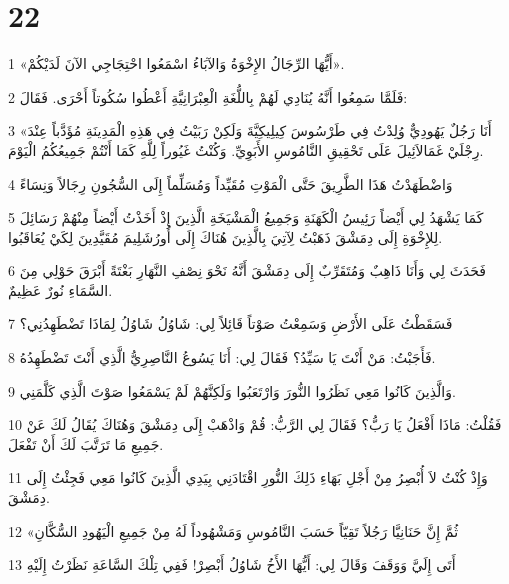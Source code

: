 \chapter{22}

\par 1 «أَيُّهَا الرِّجَالُ الإِخْوَةُ وَالآبَاءُ اسْمَعُوا احْتِجَاجِي الآنَ لَدَيْكُمْ».
\par 2 فَلَمَّا سَمِعُوا أَنَّهُ يُنَادِي لَهُمْ بِاللُّغَةِ الْعِبْرَانِيَّةِ أَعْطُوا سُكُوتاً أَحْرَى. فَقَالَ:
\par 3 «أَنَا رَجُلٌ يَهُودِيٌّ وُلِدْتُ فِي طَرْسُوسَ كِيلِيكِيَّةَ وَلَكِنْ رَبَيْتُ فِي هَذِهِ الْمَدِينَةِ مُؤَدَّباً عِنْدَ رِجْلَيْ غَمَالاَئِيلَ عَلَى تَحْقِيقِ النَّامُوسِ الأَبَوِيِّ. وَكُنْتُ غَيُوراً لِلَّهِ كَمَا أَنْتُمْ جَمِيعُكُمُ الْيَوْمَ.
\par 4 وَاضْطَهَدْتُ هَذَا الطَّرِيقَ حَتَّى الْمَوْتِ مُقَيِّداً وَمُسَلِّماً إِلَى السُّجُونِ رِجَالاً وَنِسَاءً
\par 5 كَمَا يَشْهَدُ لِي أَيْضاً رَئِيسُ الْكَهَنَةِ وَجَمِيعُ الْمَشْيَخَةِ الَّذِينَ إِذْ أَخَذْتُ أَيْضاً مِنْهُمْ رَسَائِلَ لِلإِخْوَةِ إِلَى دِمَشْقَ ذَهَبْتُ لِآتِيَ بِالَّذِينَ هُنَاكَ إِلَى أُورُشَلِيمَ مُقَيَّدِينَ لِكَيْ يُعَاقَبُوا.
\par 6 فَحَدَثَ لِي وَأَنَا ذَاهِبٌ وَمُتَقَرِّبٌ إِلَى دِمَشْقَ أَنَّهُ نَحْوَ نِصْفِ النَّهَارِ بَغْتَةً أَبْرَقَ حَوْلِي مِنَ السَّمَاءِ نُورٌ عَظِيمٌ.
\par 7 فَسَقَطْتُ عَلَى الأَرْضِ وَسَمِعْتُ صَوْتاً قَائِلاً لِي: شَاوُلُ شَاوُلُ لِمَاذَا تَضْطَهِدُنِي؟
\par 8 فَأَجَبْتُ: مَنْ أَنْتَ يَا سَيِّدُ؟ فَقَالَ لِي: أَنَا يَسُوعُ النَّاصِرِيُّ الَّذِي أَنْتَ تَضْطَهِدُهُ.
\par 9 وَالَّذِينَ كَانُوا مَعِي نَظَرُوا النُّورَ وَارْتَعَبُوا وَلَكِنَّهُمْ لَمْ يَسْمَعُوا صَوْتَ الَّذِي كَلَّمَنِي.
\par 10 فَقُلْتُ: مَاذَا أَفْعَلُ يَا رَبُّ؟ فَقَالَ لِي الرَّبُّ: قُمْ وَاذْهَبْ إِلَى دِمَشْقَ وَهُنَاكَ يُقَالُ لَكَ عَنْ جَمِيعِ مَا تَرَتَّبَ لَكَ أَنْ تَفْعَلَ.
\par 11 وَإِذْ كُنْتُ لاَ أُبْصِرُ مِنْ أَجْلِ بَهَاءِ ذَلِكَ النُّورِ اقْتَادَنِي بِيَدِي الَّذِينَ كَانُوا مَعِي فَجِئْتُ إِلَى دِمَشْقَ.
\par 12 «ثُمَّ إِنَّ حَنَانِيَّا رَجُلاً تَقِيّاً حَسَبَ النَّامُوسِ وَمَشْهُوداً لَهُ مِنْ جَمِيعِ الْيَهُودِ السُّكَّانِ
\par 13 أَتَى إِلَيَّ وَوَقَفَ وَقَالَ لِي: أَيُّهَا الأَخُ شَاوُلُ أَبْصِرْ! فَفِي تِلْكَ السَّاعَةِ نَظَرْتُ إِلَيْهِ
